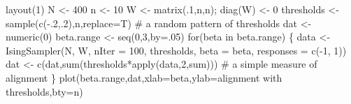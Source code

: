 \documentclass[
  a4paper,
  DIV=11,
  numbers=noendperiod,
  oneside]{scrreprt}
\newenvironment{Shaded}{\begin{snugshade}}{\end{snugshade}}
\newcommand{\AttributeTok}[1]{\textcolor[rgb]{0.40,0.45,0.13}{#1}}
\newcommand{\CommentTok}[1]{\textcolor[rgb]{0.37,0.37,0.37}{#1}}
\newcommand{\ControlFlowTok}[1]{\textcolor[rgb]{0.00,0.23,0.31}{#1}}
\newcommand{\DecValTok}[1]{\textcolor[rgb]{0.68,0.00,0.00}{#1}}
\newcommand{\FunctionTok}[1]{\textcolor[rgb]{0.28,0.35,0.67}{#1}}
\newcommand{\NormalTok}[1]{\textcolor[rgb]{0.00,0.23,0.31}{#1}}
\newcommand{\OtherTok}[1]{\textcolor[rgb]{0.00,0.23,0.31}{#1}}
\newcommand{\SpecialCharTok}[1]{\textcolor[rgb]{0.37,0.37,0.37}{#1}}
\newcommand{\StringTok}[1]{\textcolor[rgb]{0.13,0.47,0.30}{#1}}
\begin{document}
\begin{Shaded}
\begin{Highlighting}[]
\FunctionTok{layout}\NormalTok{(}\DecValTok{1}\NormalTok{)}
\NormalTok{N }\OtherTok{\textless{}{-}} \DecValTok{400}
\NormalTok{n }\OtherTok{\textless{}{-}} \DecValTok{10}
\NormalTok{W }\OtherTok{\textless{}{-}} \FunctionTok{matrix}\NormalTok{(.}\DecValTok{1}\NormalTok{,n,n); }\FunctionTok{diag}\NormalTok{(W) }\OtherTok{\textless{}{-}} \DecValTok{0}
\NormalTok{thresholds }\OtherTok{\textless{}{-}} \FunctionTok{sample}\NormalTok{(}\FunctionTok{c}\NormalTok{(}\SpecialCharTok{{-}}\NormalTok{.}\DecValTok{2}\NormalTok{,.}\DecValTok{2}\NormalTok{),n,}\AttributeTok{replace=}\NormalTok{T) }\CommentTok{\# a random pattern of thresholds}
\NormalTok{dat }\OtherTok{\textless{}{-}} \FunctionTok{numeric}\NormalTok{(}\DecValTok{0}\NormalTok{)}
\NormalTok{beta.range }\OtherTok{\textless{}{-}} \FunctionTok{seq}\NormalTok{(}\DecValTok{0}\NormalTok{,}\DecValTok{3}\NormalTok{,}\AttributeTok{by=}\NormalTok{.}\DecValTok{05}\NormalTok{)}
\ControlFlowTok{for}\NormalTok{(beta }\ControlFlowTok{in}\NormalTok{ beta.range)}
\NormalTok{\{}
\NormalTok{data }\OtherTok{\textless{}{-}} \FunctionTok{IsingSampler}\NormalTok{(N, W, }\AttributeTok{nIter =} \DecValTok{100}\NormalTok{, thresholds, }\AttributeTok{beta =}\NormalTok{ beta, }\AttributeTok{responses =} \FunctionTok{c}\NormalTok{(}\SpecialCharTok{{-}}\DecValTok{1}\NormalTok{, }\DecValTok{1}\NormalTok{))}
\NormalTok{dat }\OtherTok{\textless{}{-}} \FunctionTok{c}\NormalTok{(dat,}\FunctionTok{sum}\NormalTok{(thresholds}\SpecialCharTok{*}\FunctionTok{apply}\NormalTok{(data,}\DecValTok{2}\NormalTok{,sum))) }\CommentTok{\# a simple measure of alignment}
\NormalTok{\}}
\FunctionTok{plot}\NormalTok{(beta.range,dat,}\AttributeTok{xlab=}\StringTok{\textquotesingle{}beta\textquotesingle{}}\NormalTok{,}\AttributeTok{ylab=}\StringTok{\textquotesingle{}alignment with thresholds\textquotesingle{}}\NormalTok{,}\AttributeTok{bty=}\StringTok{\textquotesingle{}n\textquotesingle{}}\NormalTok{)}
\end{Highlighting}
\end{Shaded}
\end{document}
